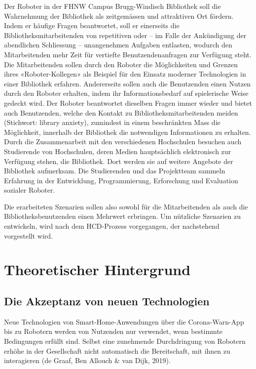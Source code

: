 \documentclass[a4paper,
fontsize=11pt,
oneside,
numbers=noperiodatend,
parskip=half-,
bibliography=totoc,
final
]{scrartcl}
\begin{document}
Der Roboter in der FHNW Campus Brugg-Windisch Bibliothek soll die
Wahrnehmung der Bibliothek als zeitgemässen und attraktiven Ort fördern.
Indem er häufige Fragen beantwortet, soll er einerseits die
Bibliotheksmitarbeitenden von repetitiven oder -- im Falle der
Ankündigung der abendlichen Schliessung -- unangenehmen Aufgaben
entlasten, wodurch den Mitarbeitenden mehr Zeit für vertiefte
Benutzendenanfragen zur Verfügung steht. Die Mitarbeitenden sollen durch
den Roboter die Möglichkeiten und Grenzen ihres «Roboter-Kollegen» als
Beispiel für den Einsatz moderner Technologien in einer Bibliothek
erfahren. Andererseits sollen auch die Benutzenden einen Nutzen durch
den Roboter erhalten, indem ihr Informationsbedarf auf spielerische
Weise gedeckt wird. Der Roboter beantwortet dieselben Fragen immer
wieder und bietet auch Benutzenden, welche den Kontakt zu
Bibliotheksmitarbeitenden meiden (Stichwort: library anxiety), zumindest
in einem beschränkten Mass die Möglichkeit, innerhalb der Bibliothek die
notwendigen Informationen zu erhalten. Durch die Zusammenarbeit mit den
verschiedenen Hochschulen besuchen auch Studierende von Hochschulen,
deren Medien hauptsächlich elektronisch zur Verfügung stehen, die
Bibliothek. Dort werden sie auf weitere Angebote der Bibliothek
aufmerksam. Die Studierenden und das Projektteam sammeln Erfahrung in
der Entwicklung, Programmierung, Erforschung und Evaluation sozialer
Roboter.

Die erarbeiteten Szenarien sollen also sowohl für die Mitarbeitenden als
auch die Bibliotheksbenutzenden einen Mehrwert erbringen. Um nützliche
Szenarien zu entwickeln, wird nach dem HCD-Prozess vorgegangen, der
nachstehend vorgestellt wird.

\hypertarget{theoretischer-hintergrund}{%
\section{Theoretischer
Hintergrund}\label{theoretischer-hintergrund}}

\hypertarget{die-akzeptanz-von-neuen-technologien}{%
\subsection{Die Akzeptanz von neuen Technologien}\label{die-akzeptanz-von-neuen-technologien}}

Neue Technologien von Smart-Home-Anwendungen über die Corona-Warn-App
bis zu Robotern werden von Nutzenden nur verwendet, wenn bestimmte
Bedingungen erfüllt sind. Selbst eine zunehmende Durchdringung von
Robotern erhöhe in der Gesellschaft nicht automatisch die Bereitschaft,
mit ihnen zu interagieren (de Graaf, Ben Allouch \& van Dijk, 2019).
\end{document}
